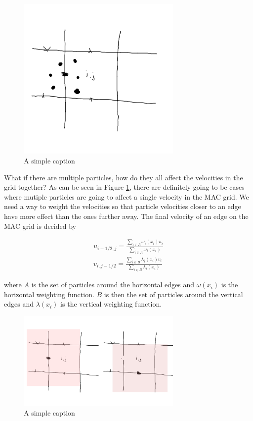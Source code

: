\begin{figure}[ht!]
\centering
\includegraphics[width=80mm]{ch3/fouredge.png}
\caption{A simple caption}
\label{fouredge}
\end{figure}

What if there are multiple particles, how do they all affect the velocities in the grid together? As can be seen in Figure \ref{fouredge}, there are definitely going to be cases where mutiple particles are going to affect a single velocity in the MAC grid. We need a way to weight the velocities so that particle velocities closer to an edge have more effect than the ones further away. The final velocity of an edge on the MAC grid is decided by

\begin{eqnarray}
u_{i-1/2,j} = \frac{\sum\limits_{i\in A}\omega_i(x_i) u_{i}}{\sum\limits_{i \in A}\omega_i(x_i)} \\
v_{i,j-1/2} = \frac{ \sum\limits_{i \in B}\lambda_i(x_i) v_{i}}{\sum\limits_{i \in B}\lambda_i(x_i)}
\label{weightsums}
\end{eqnarray}

where $A$ is the set of particles around the horizontal edges and $\omega(x_i)$ is the horizontal weighting function. $B$ is then the set of particles around the vertical edges and $\lambda(x_i)$ is the vertical weighting function.

\begin{figure}[ht!]
\centering
\includegraphics[width=80mm]{ch3/areaA.png}
\caption{A simple caption}
\label{areaa}
\end{figure}

